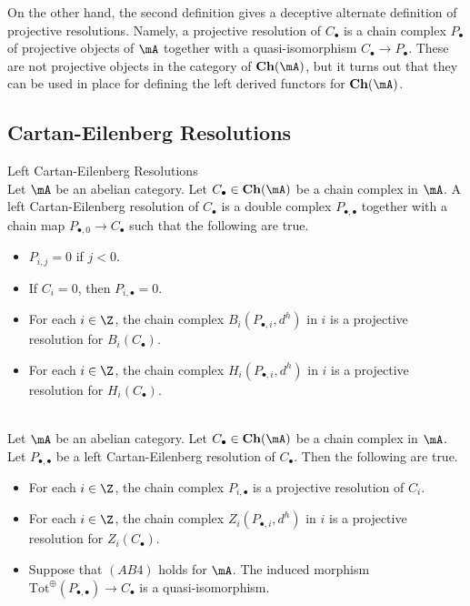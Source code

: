 \documentclass[a4paper]{article}
\begin{document}
On the other hand, the second definition gives a deceptive alternate definition of projective resolutions. Namely, a projective resolution of $C_\bullet$ is a chain complex $P_\bullet$ of projective objects of $\mA$ together with a quasi-isomorphism $C_\bullet\to P_\bullet$. These are not projective objects in the category of $\bold{Ch}(\mA)$, but it turns out that they can be used in place for defining the left derived functors for $\bold{Ch}(\mA)$. 

\subsection{Cartan-Eilenberg Resolutions}
\begin{defn}{Left Cartan-Eilenberg Resolutions}{}\\
Let $\mA$ be an abelian category. Let $C_\bullet\in\bold{Ch}(\mA)$ be a chain complex in $\mA$. A left Cartan-Eilenberg resolution of $C_\bullet$ is a double complex $P_{\bullet,\bullet}$ together with a chain map $P_{\bullet,0}\to C_\bullet$ such that the following are true. 
\begin{itemize}
\item $P_{i,j}=0$ if $j<0$. 
\item If $C_i=0$, then $P_{i,\bullet}=0$. 
\item For each $i\in\Z$, the chain complex $B_i(P_{\bullet,i},d^h)$ in $i$ is a projective resolution for $B_i(C_\bullet)$. 
\item For each $i\in\Z$, the chain complex $H_i(P_{\bullet,i},d^h)$ in $i$ is a projective resolution for $H_i(C_\bullet)$. 
\end{itemize}
\end{defn}

\begin{prp}{}{}\\
Let $\mA$ be an abelian category. Let $C_\bullet\in\bold{Ch}(\mA)$ be a chain complex in $\mA$. Let $P_{\bullet,\bullet}$ be a left Cartan-Eilenberg resolution of $C_\bullet$. Then the following are true. 
\begin{itemize}
\item For each $i\in\Z$, the chain complex $P_{i,\bullet}$ is a projective resolution of $C_i$. 
\item For each $i\in\Z$, the chain complex $Z_i(P_{\bullet,i},d^h)$ in $i$ is a projective resolution for $Z_i(C_\bullet)$. 
\item Suppose that $(AB4)$ holds for $\mA$. The induced morphism $\text{Tot}^\oplus(P_{\bullet,\bullet})\to C_\bullet$ is a quasi-isomorphism. 
\end{itemize}
\end{prp}
\end{document}
